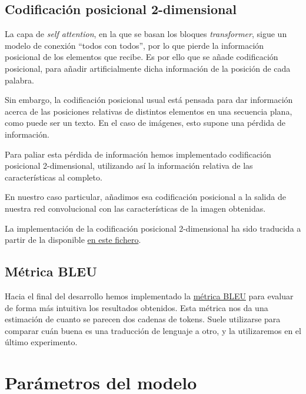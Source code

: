 \documentclass[a4paper, 20pt, dvipsnames]{article}
\begin{document}
\subsection{Codificación posicional 2-dimensional}
\label{feature:cod-pos-2d}

La capa de \emph{self attention}, en la que se basan los bloques
\textit{transformer}, sigue un modelo de conexión ``todos con todos'', por lo
que pierde la información posicional de los elementos que recibe. Es por ello
que se añade codificación posicional, para añadir artificialmente dicha
información de la posición de cada palabra.

Sin embargo, la codificación posicional usual está pensada para dar información
acerca de las posiciones relativas de distintos elementos en una secuencia
plana, como puede ser un texto. En el caso de imágenes, esto supone una pérdida
de información.

Para paliar esta pérdida de información hemos implementado codificación
posicional 2-dimensional, utilizando así la información relativa de las
características al completo.

En nuestro caso particular, añadimos esa codificación posicional a la salida de
nuestra red convolucional con las características de la imagen obtenidas.

La implementación de la codificación posicional 2-dimensional ha sido traducida
a partir de la disponible
\href{https://github.com/wzlxjtu/PositionalEncoding2D/blob/master/positionalembedding2d.py}{en
  este fichero}.

\subsection{Métrica BLEU}

Hacia el final del desarrollo hemos implementado la
\href{https://en.wikipedia.org/wiki/BLEU}{métrica BLEU} para evaluar de forma
más intuitiva los resultados obtenidos. Esta métrica nos da una estimación de
cuanto se parecen dos cadenas de tokens. Suele utilizarse para comparar cuán
buena es una traducción de lenguaje a otro, y la utilizaremos en el último
experimento.


\section{Parámetros del modelo}
\label{sec:params}
\end{document}
